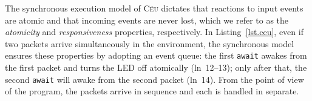 \documentclass[sigplan,10pt,review,anonymous]{acmart}\settopmatter{printfolios=true,printccs=false,printacmref=false}
\newcommand{\CEU}{\textsc{C\'{e}u}\xspace}
\newcommand{\code}[1] {{\small{\texttt{#1}}}}
\begin{document}

The synchronous execution model of \CEU dictates that reactions to input events
are atomic and that incoming events are never lost, which we refer to as the
\emph{atomicity} and \emph{responsiveness} properties, respectively.
%
%
In Listing~\ref{lst.ceu}, even if two packets arrive simultaneously in the
environment, the synchronous model ensures these properties by adopting an
event queue:
    the first \code{await} awakes from the first packet and turns the LED off
    atomically (ln~12--13);
    only after that, the second \code{await} will awake from the second packet
    (ln~14).
From the point of view of the program, the packets arrive in sequence and each
is handled in separate.
%
\end{document}
